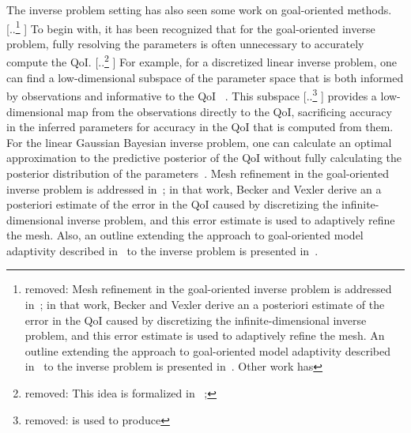 \documentclass[review]{siamart0516}
\providecommand{\DIFaddtex}[1]{{\protect\color{blue} \sf #1}} %
\providecommand{\DIFdeltex}[1]{{\protect\color{red} [..\footnote{removed: #1} ]}} %
\providecommand{\DIFaddbegin}{} %
\providecommand{\DIFaddend}{} %
\providecommand{\DIFdelbegin}{} %
\providecommand{\DIFdelend}{} %
\providecommand{\DIFadd}[1]{\texorpdfstring{\DIFaddtex{#1}}{#1}} %
\providecommand{\DIFdel}[1]{\texorpdfstring{\DIFdeltex{#1}}{}} %
\newcommand{\DIFscaledelfig}{0.5}
\newlength{\DIFdelgraphicswidth} %
\newlength{\DIFdelgraphicsheight} %
\newcommand{\DIFaddincludegraphics}[2][]{{\color{blue}\fbox{\DIFOincludegraphics[#1]{#2}}}} %
\newcommand{\DIFdelincludegraphics}[2][]{%
\sbox{\DIFdelgraphicsbox}{\DIFOincludegraphics[#1]{#2}}%
\settoboxwidth{\DIFdelgraphicswidth}{\DIFdelgraphicsbox} %
\settoboxtotalheight{\DIFdelgraphicsheight}{\DIFdelgraphicsbox} %
\scalebox{\DIFscaledelfig}{%
\parbox[b]{\DIFdelgraphicswidth}{\usebox{\DIFdelgraphicsbox}\\[-\baselineskip] \rule{\DIFdelgraphicswidth}{0em}}\llap{\resizebox{\DIFdelgraphicswidth}{\DIFdelgraphicsheight}{%
\setlength{\unitlength}{\DIFdelgraphicswidth}%
\begin{picture}(1,1)%
\thicklines\linethickness{2pt} %
{\color[rgb]{1,0,0}\put(0,0){\framebox(1,1){}}}%
{\color[rgb]{1,0,0}\put(0,0){\line( 1,1){1}}}%
{\color[rgb]{1,0,0}\put(0,1){\line(1,-1){1}}}%
\end{picture}%
}\hspace*{3pt}}} %
} %
\DeclareRobustCommand{\DIFaddbegin}{\DIFOaddbegin \let\includegraphics\DIFaddincludegraphics} %
\DeclareRobustCommand{\DIFaddend}{\DIFOaddend \let\includegraphics\DIFOincludegraphics} %
\DeclareRobustCommand{\DIFdelbegin}{\DIFOdelbegin \let\includegraphics\DIFdelincludegraphics} %
\DeclareRobustCommand{\DIFdelend}{\DIFOaddend \let\includegraphics\DIFOincludegraphics} %
\begin{document}
The inverse problem setting has also seen some work on goal-oriented methods. \DIFdelbegin \DIFdel{Mesh refinement in the goal-oriented inverse problem is addressed in~\cite{BecVex05}; in that work, Becker and Vexler derive an a posteriori estimate of the error in the QoI caused by discretizing the infinite-dimensional inverse problem, and this error estimate is used to adaptively refine the mesh. An outline extending the approach to goal-oriented model adaptivity described in~\cite{OdenPrudetal06} to the inverse problem is presented in~\cite{OdenPrudetal10}. Other work has }\DIFdelend \DIFaddbegin \DIFadd{To begin with, it has been }\DIFaddend recognized that for the goal-oriented inverse problem, fully resolving the parameters is often unnecessary to accurately compute the QoI. \DIFdelbegin \DIFdel{This idea is formalized in ~\cite{LiebWill13}; }\DIFdelend \DIFaddbegin \DIFadd{For example, }\DIFaddend for a discretized linear inverse problem, one can find a low-dimensional subspace of the parameter space that is both informed by observations and informative to the QoI\DIFaddbegin \DIFadd{~\cite{LiebWill13}}\DIFaddend . This subspace \DIFdelbegin \DIFdel{is used to produce }\DIFdelend \DIFaddbegin \DIFadd{provides }\DIFaddend a low-dimensional map from the observations directly to the QoI, sacrificing accuracy in the inferred parameters for accuracy in the QoI that is computed from them. For the linear Gaussian Bayesian inverse problem, one can calculate an optimal approximation to the predictive posterior of the QoI without fully calculating the posterior distribution of the parameters~\cite{Span16}. \DIFaddbegin \DIFadd{Mesh refinement in the goal-oriented inverse problem is addressed in~\cite{BecVex05}; in that work, Becker and Vexler derive an a posteriori estimate of the error in the QoI caused by discretizing the infinite-dimensional inverse problem, and this error estimate is used to adaptively refine the mesh. Also, an outline extending the approach to goal-oriented model adaptivity described in~\cite{OdenPrudetal06} to the inverse problem is presented in~\cite{OdenPrudetal10}. 
}\DIFaddend 
\end{document}
